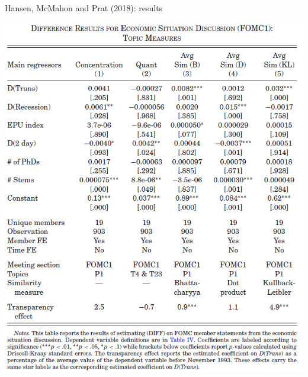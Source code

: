 \documentclass[english]{beamer}
\begin{document}
\begin{frame}{\small{Hansen, McMahon and Prat (2018): results}}
\vspace{-7pt}
\begin{center}
\includegraphics[scale=0.37]{Images/hansen2018e.png}
\end{center}
\end{frame}
\end{document}
